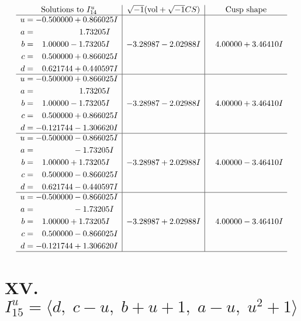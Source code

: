 \documentclass[1p]{elsarticle_modified}
\theoremstyle{definition}
\newcommand{\I}{\sqrt{-1}}
\begin{document}
$$\begin{array}{c|c|c}  
\text{Solutions to }I^u_{14}& \I (\text{vol} + \sqrt{-1}CS) & \text{Cusp shape}\\
 \hline 
\begin{aligned}
u &= -0.500000 + 0.866025 I \\
a &= \phantom{-0.000000 -}1.73205 I \\
b &= \phantom{-}1.00000 - 1.73205 I \\
c &= \phantom{-}0.500000 + 0.866025 I \\
d &= \phantom{-}0.621744 + 0.440597 I\end{aligned}
 & -3.28987 - 2.02988 I & \phantom{-}4.00000 + 3.46410 I \\ \hline\begin{aligned}
u &= -0.500000 + 0.866025 I \\
a &= \phantom{-0.000000 -}1.73205 I \\
b &= \phantom{-}1.00000 - 1.73205 I \\
c &= \phantom{-}0.500000 + 0.866025 I \\
d &= -0.121744 - 1.306620 I\end{aligned}
 & -3.28987 - 2.02988 I & \phantom{-}4.00000 + 3.46410 I \\ \hline\begin{aligned}
u &= -0.500000 - 0.866025 I \\
a &= \phantom{-0.000000 } -1.73205 I \\
b &= \phantom{-}1.00000 + 1.73205 I \\
c &= \phantom{-}0.500000 - 0.866025 I \\
d &= \phantom{-}0.621744 - 0.440597 I\end{aligned}
 & -3.28987 + 2.02988 I & \phantom{-}4.00000 - 3.46410 I \\ \hline\begin{aligned}
u &= -0.500000 - 0.866025 I \\
a &= \phantom{-0.000000 } -1.73205 I \\
b &= \phantom{-}1.00000 + 1.73205 I \\
c &= \phantom{-}0.500000 - 0.866025 I \\
d &= -0.121744 + 1.306620 I\end{aligned}
 & -3.28987 + 2.02988 I & \phantom{-}4.00000 - 3.46410 I\\
 \hline 
 \end{array}$$\newpage\newpage\renewcommand{\arraystretch}{1}
\centering \section*{XV. $I^u_{15}= \langle d,\;c- u,\;b+u+1,\;a- u,\;u^2+1 \rangle$}
\end{document}
